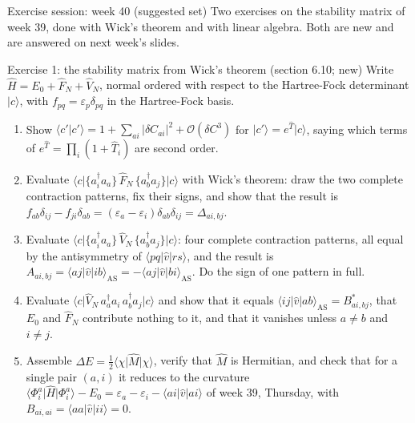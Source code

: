 \documentclass[aspectratio=169,10pt]{beamer}
\newcommand{\ket}[1]{\vert #1\rangle}
\newcommand{\bra}[1]{\langle #1\vert}
\newcommand{\braket}[2]{\langle #1\vert #2\rangle}
\newcommand{\element}[3]{\langle #1\vert #2\vert #3\rangle}
\newcommand{\nc}[1]{\bigl\{#1\bigr\}}
\newcommand{\bigO}{\mathcal{O}}
\begin{document}
\begin{frame}{Exercise session: week 40 (suggested set)}
  \footnotesize
  Two exercises on the stability matrix of week 39, done with Wick's theorem and with linear algebra. Both are new and are answered on next week's slides.
  \begin{block}{Exercise 1: the stability matrix from Wick's theorem (section 6.10; new)}
    Write $\hat H=E_0+\hat F_N+\hat V_N$, normal ordered with respect to the Hartree-Fock determinant $\ket{c}$, with $f_{pq}=\varepsilon_p\delta_{pq}$ in the Hartree-Fock basis.
    \begin{enumerate}
      \item[a)] Show $\braket{c'}{c'}=1+\sum_{ai}|\delta C_{ai}|^2+\bigO(\delta C^3)$ for $\ket{c'}=e^{\hat T}\ket{c}$, saying which terms of $e^{\hat T}=\prod_i(1+\hat T_i)$ are second order.
      \item[b)] Evaluate $\element{c}{\nc{a_i^{\dagger}a_a}\,\hat F_N\,\nc{a_b^{\dagger}a_j}}{c}$ with Wick's theorem: draw the two complete contraction patterns, fix their signs, and show that the result is $f_{ab}\delta_{ij}-f_{ji}\delta_{ab}=(\varepsilon_a-\varepsilon_i)\delta_{ab}\delta_{ij}=\Delta_{ai,bj}$.
      \item[c)] Evaluate $\element{c}{\nc{a_i^{\dagger}a_a}\,\hat V_N\,\nc{a_b^{\dagger}a_j}}{c}$: four complete contraction patterns, all equal by the antisymmetry of $\element{pq}{\hat v}{rs}$, and the result is $A_{ai,bj}=\element{aj}{\hat v}{ib}_{\mathrm{AS}}=-\element{aj}{\hat v}{bi}_{\mathrm{AS}}$. Do the sign of one pattern in full.
      \item[d)] Evaluate $\element{c}{\hat V_N\,a_a^{\dagger}a_i\,a_b^{\dagger}a_j}{c}$ and show that it equals $\element{ij}{\hat v}{ab}_{\mathrm{AS}}=B^{*}_{ai,bj}$, that $E_0$ and $\hat F_N$ contribute nothing to it, and that it vanishes unless $a\ne b$ and $i\ne j$.
      \item[e)] Assemble $\Delta E=\frac12\bra{\chi}\hat M\ket{\chi}$, verify that $\hat M$ is Hermitian, and check that for a single pair $(a,i)$ it reduces to the curvature $\element{\Phi_i^a}{\hat H}{\Phi_i^a}-E_0=\varepsilon_a-\varepsilon_i-\element{ai}{\hat v}{ai}$ of week 39, Thursday, with $B_{ai,ai}=\element{aa}{\hat v}{ii}=0$.
    \end{enumerate}
  \end{block}
\end{frame}
\end{document}
